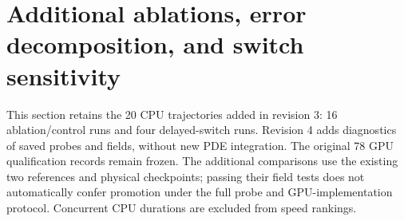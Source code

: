 \section{Additional ablations, error decomposition, and switch sensitivity}
\label{sec:review-experiments}

This section retains the 20 CPU trajectories added in revision 3: 16 ablation/control runs and four delayed-switch runs. Revision 4 adds diagnostics of saved probes and fields, without new PDE integration. The original 78 GPU qualification records remain frozen. The additional comparisons use the existing two references and physical checkpoints; passing their field tests does not automatically confer promotion under the full probe and GPU-implementation protocol. Concurrent CPU durations are excluded from speed rankings.




\FloatBarrier
